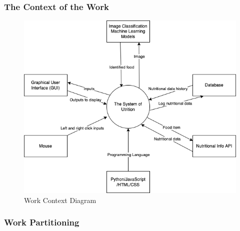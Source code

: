 \documentclass[12pt]{article}
\begin{document}
{\subsubsection{The Context of the Work}
\begin{figure}[H]
	\centering
	\includegraphics[scale=0.6]{work_context_diagram.png}
	\caption{Work Context Diagram}
\end{figure}


\subsubsection{Work Partitioning}

}
\end{document}
